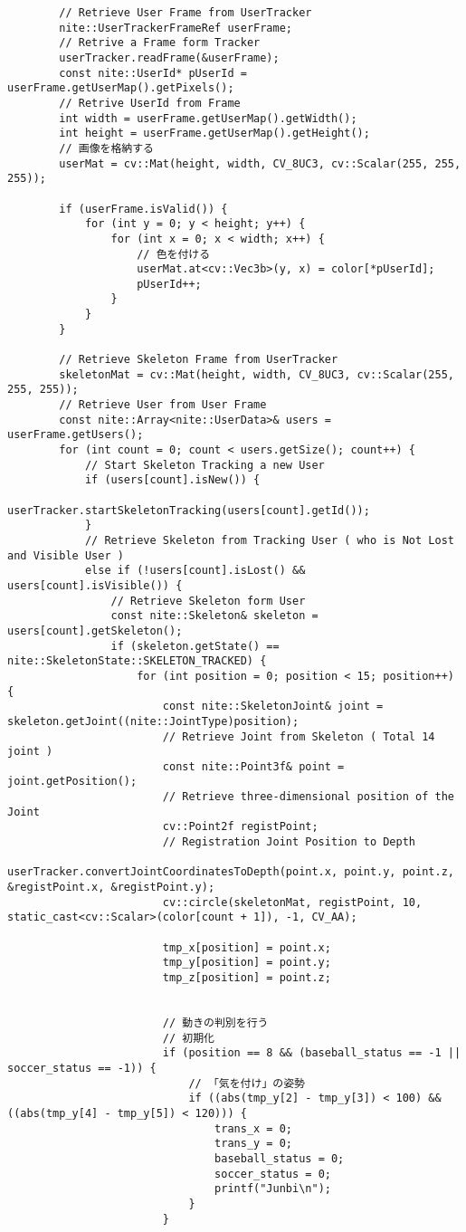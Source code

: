 \begin{lstlisting}
		// Retrieve User Frame from UserTracker
		nite::UserTrackerFrameRef userFrame;
		// Retrive a Frame form Tracker
		userTracker.readFrame(&userFrame); 
		const nite::UserId* pUserId = userFrame.getUserMap().getPixels();
		// Retrive UserId from Frame
		int width = userFrame.getUserMap().getWidth();
		int height = userFrame.getUserMap().getHeight();
		// 画像を格納する
		userMat = cv::Mat(height, width, CV_8UC3, cv::Scalar(255, 255, 255));

		if (userFrame.isValid()) {
			for (int y = 0; y < height; y++) {
				for (int x = 0; x < width; x++) {
					// 色を付ける
					userMat.at<cv::Vec3b>(y, x) = color[*pUserId]; 
					pUserId++;
				}
			}
		}

		// Retrieve Skeleton Frame from UserTracker
		skeletonMat = cv::Mat(height, width, CV_8UC3, cv::Scalar(255, 255, 255));
		// Retrieve User from User Frame
		const nite::Array<nite::UserData>& users = userFrame.getUsers(); 
		for (int count = 0; count < users.getSize(); count++) {
			// Start Skeleton Tracking a new User
			if (users[count].isNew()) {
				userTracker.startSkeletonTracking(users[count].getId());
			}
			// Retrieve Skeleton from Tracking User ( who is Not Lost and Visible User )
			else if (!users[count].isLost() && users[count].isVisible()) {
				// Retrieve Skeleton form User
				const nite::Skeleton& skeleton = users[count].getSkeleton(); 
				if (skeleton.getState() == nite::SkeletonState::SKELETON_TRACKED) {
					for (int position = 0; position < 15; position++) {
						const nite::SkeletonJoint& joint = skeleton.getJoint((nite::JointType)position);
						// Retrieve Joint from Skeleton ( Total 14 joint )
						const nite::Point3f& point = joint.getPosition();
						// Retrieve three-dimensional position of the Joint
						cv::Point2f registPoint;
						// Registration Joint Position to Depth
						userTracker.convertJointCoordinatesToDepth(point.x, point.y, point.z, &registPoint.x, &registPoint.y);
						cv::circle(skeletonMat, registPoint, 10, static_cast<cv::Scalar>(color[count + 1]), -1, CV_AA);

						tmp_x[position] = point.x;
						tmp_y[position] = point.y;
						tmp_z[position] = point.z;


						// 動きの判別を行う
						// 初期化
						if (position == 8 && (baseball_status == -1 || soccer_status == -1)) {
							// 「気を付け」の姿勢
							if ((abs(tmp_y[2] - tmp_y[3]) < 100) && ((abs(tmp_y[4] - tmp_y[5]) < 120))) {
								trans_x = 0;
								trans_y = 0;
								baseball_status = 0;
								soccer_status = 0;
								printf("Junbi\n");
							}
						}


\end{lstlisting}
